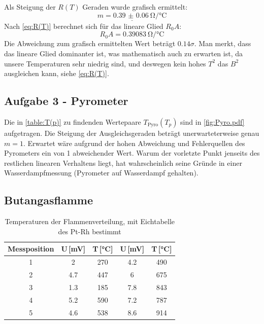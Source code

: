 Als Steigung der \(R(T)\) Geraden wurde grafisch ermittelt:
\[\underline{m=\qty{0.39(6)}{\ohm\per\degreeCelsius}}\]
Nach \cref{eq:R(T)} berechnet sich für das lineare Glied \(R_0A\): 
\[R_0A=\qty{0.39083}{\ohm\per\degreeCelsius}\]
Die Abweichung zum grafisch ermittelten Wert beträgt \(0.14\sigma\). 
Man merkt, dass das lineare Glied dominanter ist, was mathematisch auch zu erwarten ist, da unsere Temperaturen sehr niedrig sind, und deswegen kein hohes \(T^2\) das \(B^2\) ausgleichen kann, siehe \cref{eq:R(T)}.

\FloatBarrier

\subsection{Aufgabe 3 - Pyrometer}
Die in \cref{table:T(p)} zu findenden Wertepaare \(T_{\text{Pyro}}(T_p)\) sind in \cref{fig:Pyro.pdf} aufgetragen.  
Die Steigung der Ausgleichsgeraden beträgt unerwarteterweise genau \(m=1\). Erwartet wäre aufgrund der hohen Abweichung und Fehlerquellen des Pyrometers ein von 1 abweichender Wert. Warum der vorletzte Punkt jenseits des restlichen linearen Verhaltens liegt, hat wahrscheinlich seine Gründe in einer Wasserdampfmessung (Pyrometer auf Wasserdampf gehalten).

\setcellgapes{3pt}
\subsection{Butangasflamme}
\begin{table}[htbp]
   \centering\makegapedcells
   \caption{Temperaturen der Flammenverteilung, mit Eichtabelle des Pt-Rh bestimmt}
\begin{tabular}{|c|C|C|C|C|}\hline
Messposition & \;U\,[\unit{\milli\volt}]  &  T\,[\unit{\degreeCelsius}]   &   \; U\,[\unit{\milli\volt}]  & T\,[\unit{\degreeCelsius}]   \\ &2   & 270 & 4.2 & 490 \\
2&4.7 & 447 & 6   & 675 \\
3&1.3 & 185 & 7.8 & 843 \\
4&5.2 & 590 & 7.2 & 787 \\
5&4.6 & 538 & 8.6 & 914 \\ \hline
\end{tabular}
\end{table}

